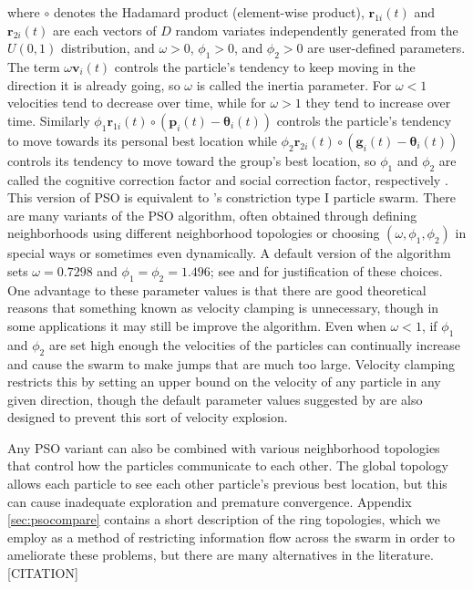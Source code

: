 \documentclass[12pt]{article}
\begin{document}
where $\circ$ denotes the Hadamard product (element-wise product), $\bm{r}_{1i}(t)$ and $\bm{r}_{2i}(t)$ are each vectors of $D$ random variates independently generated from the $U(0,1)$ distribution, and $\omega>0$, $\phi_1>0$, and $\phi_2>0$ are user-defined parameters. The term $\omega \bm{v}_i(t)$ controls the particle's tendency to keep moving in the direction it is already going, so $\omega$ is called the inertia parameter. For $\omega<1$ velocities tend to decrease over time, while for $\omega>1$ they tend to increase over time. Similarly $\phi_1 \bm{r}_{1i}(t)\circ(\bm{p}_i(t) - \bm{\theta}_i(t))$ controls the particle's tendency to move towards its personal best location while $\phi_2 \bm{r}_{2i}(t)\circ(\bm{g}_i(t) - \bm{\theta}_i(t))$ controls its tendency to move toward the group's best location, so $\phi_1$ and $\phi_2$ are called the cognitive correction factor and social correction factor, respectively \citep{blum2008swarm}. This version of PSO is equivalent to \citet{clerc2002particle}'s constriction type I particle swarm. There are many variants of the PSO algorithm, often obtained through defining neighborhoods using different neighborhood topologies or choosing $(\omega,\phi_1,\phi_2)$ in special ways or sometimes even dynamically. A default version of the algorithm sets $\omega = 0.7298$ and $\phi_1 = \phi_2 = 1.496$; see \citet{clerc2002particle} and \citet{blum2008swarm} for justification of these choices. One advantage to these parameter values is that there are good theoretical reasons that something known as velocity clamping is unnecessary, though in some applications it may still be improve the algorithm. Even when $\omega<1$, if $\phi_1$ and $\phi_2$ are set high enough the velocities of the particles can continually increase and cause the swarm to make jumps that are much too large. Velocity clamping restricts this by setting an upper bound on the velocity of any particle in any given direction, though the default parameter values suggested by \citet{clerc2002particle} are also designed to prevent this sort of velocity explosion.

Any PSO variant can also be combined with various neighborhood topologies that control how the particles communicate to each other. The global topology allows each particle to see each other particle's previous best location, but this can cause inadequate exploration and premature convergence. Appendix \ref{sec:psocompare} contains a short description of the ring topologies, which we employ as a method of restricting information flow across the swarm in order to ameliorate these problems, but there are many alternatives in the literature.[CITATION]
\end{document}
